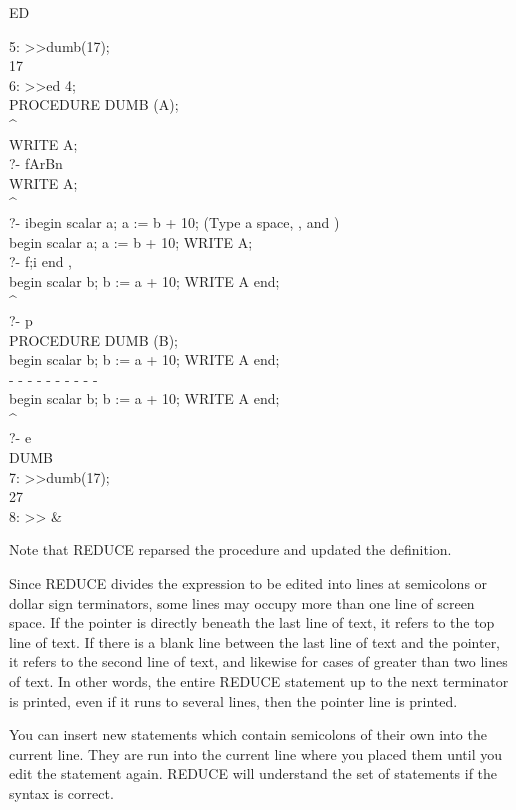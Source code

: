 \begin{Command}{ED}
\begin{Examples}
5: >>dumb(17); \\
17 \\
6: >>ed 4; \\
  PROCEDURE DUMB (A); \\
  ^ \\
WRITE A; \\
?- fArBn \\
  WRITE A; \\
  ^ \\
?- ibegin scalar a; a := b + 10; (Type a space, , and ) \\
  begin scalar a; a := b + 10; WRITE A; \\
?- f;i end ,  \\
  begin scalar b; b := a + 10; WRITE A end; \\
					  ^ \\
?- p \\
 PROCEDURE DUMB (B); \\
 begin scalar b; b := a + 10; WRITE A end; \\
 -  -  -  -  -  -  -  -  -  - \\
  begin scalar b; b := a + 10; WRITE A end; \\
					  ^ \\
?- e \\
DUMB \\
7: >>dumb(17); \\
27 \\
8: >> &
\end{Examples}

\begin{Comments}
Note that REDUCE reparsed the procedure  and updated the
definition.

Since REDUCE divides the expression to be edited into lines at semicolons or
dollar sign terminators, some lines may occupy more than one line of screen
space.  If the pointer is directly beneath the last line of text, it
refers to the top line of text.  If there is a blank line between the
last line of text and the pointer, it refers to the second line
of text, and likewise for cases of greater than two lines of text.  In other
words, the entire REDUCE statement up to the next terminator is printed, even 
if it runs to several lines, then the pointer line is printed.  

You can insert new statements which contain semicolons of their own into the 
current line.  They are run into the current line where you placed them 
until you edit the statement again.  REDUCE will understand the set of
statements if the syntax is correct.


\end{Comments}
\end{Command}
